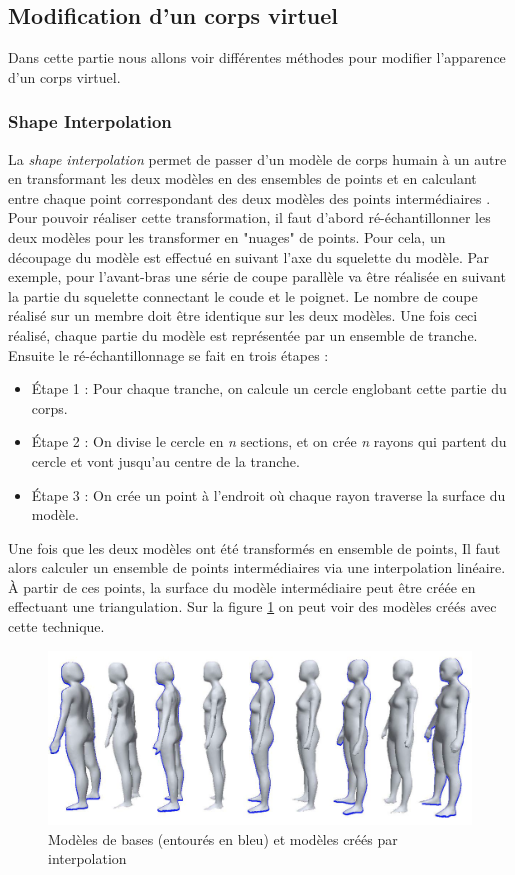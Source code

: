 \subsection{Modification d'un corps virtuel}
Dans cette partie nous allons voir différentes méthodes pour modifier l'apparence d'un corps virtuel.

\subsubsection{Shape Interpolation}

La \emph{shape interpolation} permet de passer d'un modèle de corps humain à un autre en transformant les deux modèles en des ensembles de points et en calculant entre chaque point correspondant des deux modèles des points intermédiaires \cite{zh09}. Pour pouvoir réaliser cette transformation, il faut d'abord ré-échantillonner les deux modèles pour les transformer en "nuages" de points. Pour cela, un découpage du modèle est effectué en suivant l'axe du squelette du modèle. Par exemple, pour l'avant-bras une série de coupe parallèle va être réalisée en suivant la partie du squelette connectant le coude et le poignet. Le nombre de coupe réalisé sur un membre doit être identique sur les deux modèles. Une fois ceci réalisé, chaque partie du modèle est représentée par un ensemble de tranche. Ensuite le ré-échantillonnage se fait en trois étapes :
\begin{itemize}
\item \'{E}tape 1 : Pour chaque tranche, on calcule un cercle englobant cette partie du corps.
\item \'{E}tape 2 : On divise le cercle en \emph{n} sections, et on crée \emph{n} rayons qui partent du cercle et vont jusqu'au centre de la tranche.
\item \'{E}tape 3 : On crée un point à l'endroit où chaque rayon traverse la surface du modèle.
\end{itemize}

Une fois que les deux modèles ont été transformés en ensemble de points, Il faut alors calculer un ensemble de points intermédiaires via une interpolation linéaire. \`{A} partir de ces points, la surface du modèle intermédiaire peut être créée en effectuant une triangulation. Sur la figure \ref{fig4} on peut voir des modèles créés avec cette technique.
\begin{figure}[!h]
   	\centerline{\includegraphics[scale=0.4]{images/biblio/shapeInterpolation2}}
   	\caption{\label{fig4} Modèles de bases (entourés en bleu) et modèles créés par interpolation \cite{zh09}}
\end{figure}
